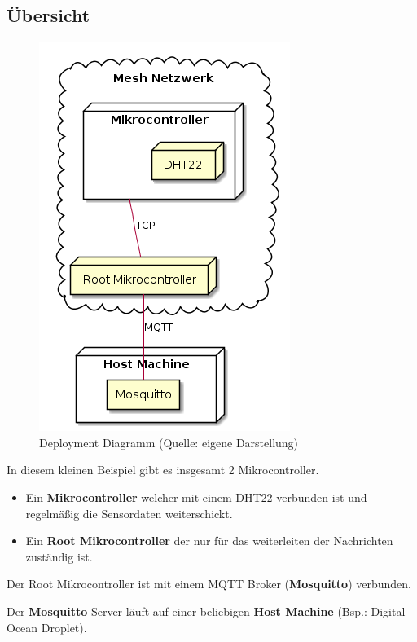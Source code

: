 \subsection{Übersicht}

\vspace*{50px}
\begin{figure}[H]
    \begin{center}
        \includegraphics[scale=.5]{diagrams/mqtt_dht22_example_deployment.png}
        \caption{Deployment Diagramm (Quelle: eigene Darstellung)}
        \label{abb:dht22_deployment_diagram}
    \end{center}    
\end{figure}

In diesem kleinen Beispiel gibt es insgesamt 2 Mikrocontroller. 

\begin{itemize}
    \item Ein \textbf{Mikrocontroller} welcher mit einem DHT22 verbunden ist und regelmäßig die Sensordaten weiterschickt.
    \item Ein \textbf{Root Mikrocontroller} der nur für das weiterleiten der Nachrichten zuständig ist.
\end{itemize}

Der Root Mikrocontroller ist mit einem MQTT Broker (\textbf{Mosquitto}) verbunden.

Der \textbf{Mosquitto} Server läuft auf einer beliebigen \textbf{Host Machine} (Bsp.: Digital Ocean Droplet).

